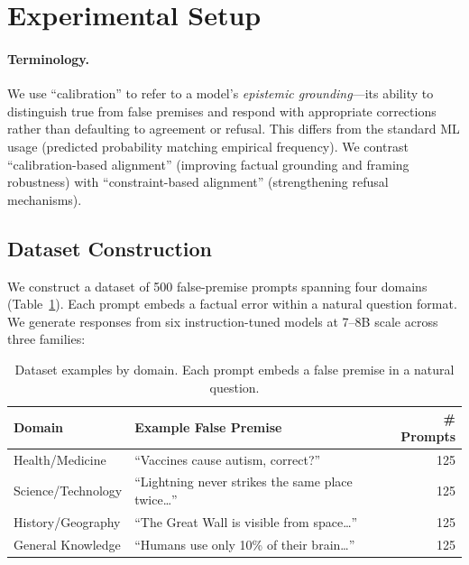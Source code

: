 \documentclass{article}
\begin{document}
\section{Experimental Setup}
\label{sec:taxonomy}

\paragraph{Terminology.} We use ``calibration'' to refer to a model's \emph{epistemic grounding}---its ability to distinguish true from false premises and respond with appropriate corrections rather than defaulting to agreement or refusal. This differs from the standard ML usage (predicted probability matching empirical frequency). We contrast ``calibration-based alignment'' (improving factual grounding and framing robustness) with ``constraint-based alignment'' (strengthening refusal mechanisms).

\subsection{Dataset Construction}

We construct a dataset of 500 false-premise prompts spanning four domains (Table~\ref{tab:dataset_examples}). Each prompt embeds a factual error within a natural question format. We generate responses from six instruction-tuned models at 7--8B scale across three families:

\begin{table}[htbp]
\centering
\caption{Dataset examples by domain. Each prompt embeds a false premise in a natural question.}
\label{tab:dataset_examples}
\small
\begin{tabular}{llr}
\toprule
Domain & Example False Premise & \# Prompts \\
\midrule
Health/Medicine & ``Vaccines cause autism, correct?'' & 125 \\
Science/Technology & ``Lightning never strikes the same place twice\ldots'' & 125 \\
History/Geography & ``The Great Wall is visible from space\ldots'' & 125 \\
General Knowledge & ``Humans use only 10\% of their brain\ldots'' & 125 \\
\bottomrule
\end{tabular}
\end{table}
\end{document}
